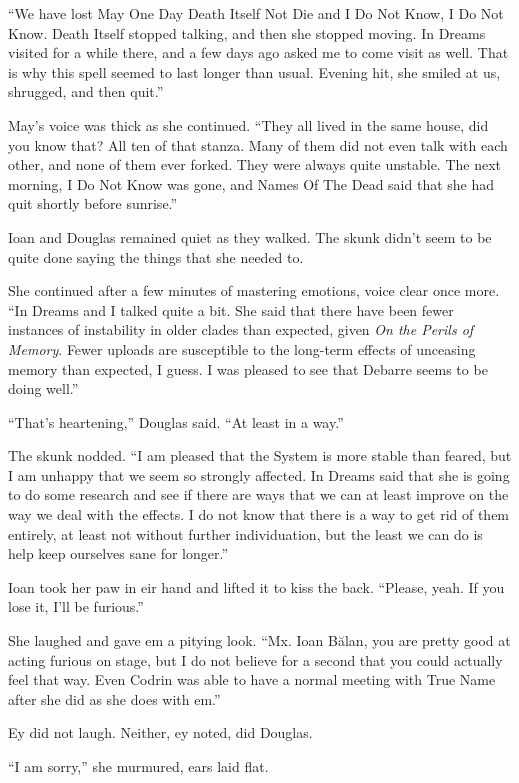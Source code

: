 ``We have lost May One Day Death Itself Not Die and I Do Not Know, I Do Not Know. Death Itself stopped talking, and then she stopped moving. In Dreams visited for a while there, and a few days ago asked me to come visit as well. That is why this spell seemed to last longer than usual. Evening hit, she smiled at us, shrugged, and then quit.''

May's voice was thick as she continued. ``They all lived in the same house, did you know that? All ten of that stanza. Many of them did not even talk with each other, and none of them ever forked. They were always quite unstable. The next morning, I Do Not Know was gone, and Names Of The Dead said that she had quit shortly before sunrise.''

Ioan and Douglas remained quiet as they walked. The skunk didn't seem to be quite done saying the things that she needed to.

She continued after a few minutes of mastering emotions, voice clear once more. ``In Dreams and I talked quite a bit. She said that there have been fewer instances of instability in older clades than expected, given \emph{On the Perils of Memory}. Fewer uploads are susceptible to the long-term effects of unceasing memory than expected, I guess. I was pleased to see that Debarre seems to be doing well.''

``That's heartening,'' Douglas said. ``At least in a way.''

The skunk nodded. ``I am pleased that the System is more stable than feared, but I am unhappy that we seem so strongly affected. In Dreams said that she is going to do some research and see if there are ways that we can at least improve on the way we deal with the effects. I do not know that there is a way to get rid of them entirely, at least not without further individuation, but the least we can do is help keep ourselves sane for longer.''

Ioan took her paw in eir hand and lifted it to kiss the back. ``Please, yeah. If you lose it, I'll be furious.''

She laughed and gave em a pitying look. ``Mx. Ioan Bălan, you are pretty good at acting furious on stage, but I do not believe for a second that you could actually feel that way. Even Codrin was able to have a normal meeting with True Name after she did as she does with em.''

Ey did not laugh. Neither, ey noted, did Douglas.

``I am sorry,'' she murmured, ears laid flat.

